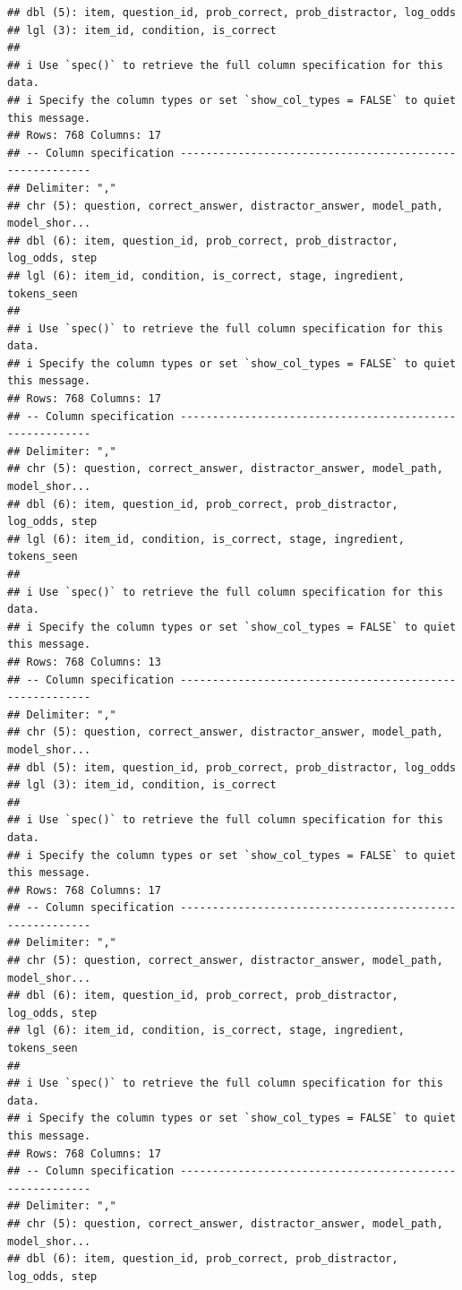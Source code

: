 \documentclass[
]{article}
\begin{document}
\begin{verbatim}
## dbl (5): item, question_id, prob_correct, prob_distractor, log_odds
## lgl (3): item_id, condition, is_correct
## 
## i Use `spec()` to retrieve the full column specification for this data.
## i Specify the column types or set `show_col_types = FALSE` to quiet this message.
## Rows: 768 Columns: 17
## -- Column specification --------------------------------------------------------
## Delimiter: ","
## chr (5): question, correct_answer, distractor_answer, model_path, model_shor...
## dbl (6): item, question_id, prob_correct, prob_distractor, log_odds, step
## lgl (6): item_id, condition, is_correct, stage, ingredient, tokens_seen
## 
## i Use `spec()` to retrieve the full column specification for this data.
## i Specify the column types or set `show_col_types = FALSE` to quiet this message.
## Rows: 768 Columns: 17
## -- Column specification --------------------------------------------------------
## Delimiter: ","
## chr (5): question, correct_answer, distractor_answer, model_path, model_shor...
## dbl (6): item, question_id, prob_correct, prob_distractor, log_odds, step
## lgl (6): item_id, condition, is_correct, stage, ingredient, tokens_seen
## 
## i Use `spec()` to retrieve the full column specification for this data.
## i Specify the column types or set `show_col_types = FALSE` to quiet this message.
## Rows: 768 Columns: 13
## -- Column specification --------------------------------------------------------
## Delimiter: ","
## chr (5): question, correct_answer, distractor_answer, model_path, model_shor...
## dbl (5): item, question_id, prob_correct, prob_distractor, log_odds
## lgl (3): item_id, condition, is_correct
## 
## i Use `spec()` to retrieve the full column specification for this data.
## i Specify the column types or set `show_col_types = FALSE` to quiet this message.
## Rows: 768 Columns: 17
## -- Column specification --------------------------------------------------------
## Delimiter: ","
## chr (5): question, correct_answer, distractor_answer, model_path, model_shor...
## dbl (6): item, question_id, prob_correct, prob_distractor, log_odds, step
## lgl (6): item_id, condition, is_correct, stage, ingredient, tokens_seen
## 
## i Use `spec()` to retrieve the full column specification for this data.
## i Specify the column types or set `show_col_types = FALSE` to quiet this message.
## Rows: 768 Columns: 17
## -- Column specification --------------------------------------------------------
## Delimiter: ","
## chr (5): question, correct_answer, distractor_answer, model_path, model_shor...
## dbl (6): item, question_id, prob_correct, prob_distractor, log_odds, step

\end{verbatim}
\end{document}

